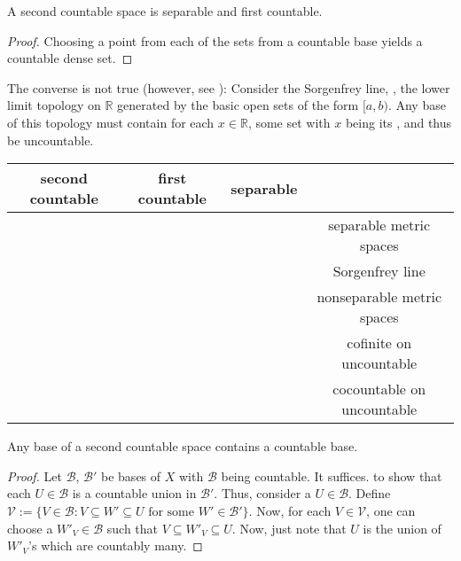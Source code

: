 	\begin{lem}
		A second countable space is separable and first countable.
	\end{lem}
	
	\begin{proof}
		Choosing a point from each of the sets from a countable base yields a countable dense set.
	\end{proof}
	
	\begin{rmk}
		The converse is not true (however, see ): Consider the Sorgenfrey line, \ie, the lower limit topology on $\mathbb R$ generated by the basic open sets of the form $[a, b)$. Any base of this topology must contain for each $x\in\mathbb R$, some set with $x$ being its \lub, and thus be uncountable.
	\end{rmk}
	
	\begin{center}
		\begin{tabular}{c|c|c|c}
			second countable & first countable & separable & \\
			\hline
			\mycheck & & & separable metric spaces\\
			\mycross & \mycheck & \mycheck & Sorgenfrey line\\
			\mycross & \mycheck & \mycross & nonseparable metric spaces\footnotemark\\
			& \mycross & \mycheck & cofinite on uncountable\\
			& \mycross & \mycross & cocountable on uncountable
		\end{tabular}
	\end{center}
	

	\begin{prp}
		Any base of a second countable space contains a countable base.
	\end{prp}
	
	\begin{proof}
		Let $\mathscr B$, $\mathscr B'$ be bases of $X$ with $\mathscr B$ being countable. It suffices.
		to show that each $U\in\mathscr B$ is a countable union in $\mathscr B'$. Thus, consider a $U\in\mathscr B$.
		Define $\mathscr V:= \{V\in\mathscr B : V\subseteq W'\subseteq U \text{ for some } W'\in\mathscr B'\}$. Now, for each $V\in\mathscr V$, one can choose
		a $W'_V\in\mathscr B$ such that $V\subseteq W'_V\subseteq U$. Now, just note that $U$ is the union of $W'_V$'s which are countably many.
	\end{proof}
	
